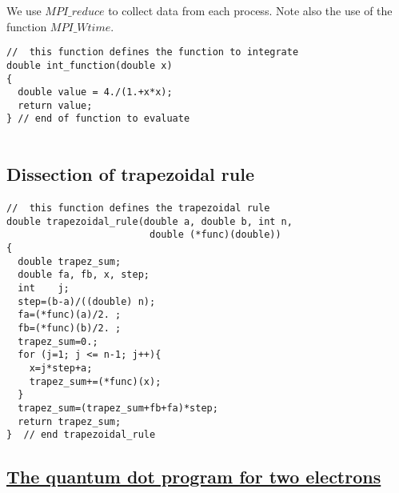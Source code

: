 \documentclass[%
oneside,                 %
final,                   %
10pt]{article}
\begin{document}
We use $MPI\_reduce$ to collect data from each process. Note also the use of the function 
$MPI\_Wtime$. 








\begin{verbatim}
//  this function defines the function to integrate
double int_function(double x)
{
  double value = 4./(1.+x*x);
  return value;
} // end of function to evaluate


\end{verbatim}



\subsection*{Dissection of trapezoidal rule}

\paragraph{}



















\begin{verbatim}
//  this function defines the trapezoidal rule
double trapezoidal_rule(double a, double b, int n, 
                         double (*func)(double))
{
  double trapez_sum;
  double fa, fb, x, step;
  int    j;
  step=(b-a)/((double) n);
  fa=(*func)(a)/2. ;
  fb=(*func)(b)/2. ;
  trapez_sum=0.;
  for (j=1; j <= n-1; j++){
    x=j*step+a;
    trapez_sum+=(*func)(x);
  }
  trapez_sum=(trapez_sum+fb+fa)*step;
  return trapez_sum;
}  // end trapezoidal_rule 

\end{verbatim}



\subsection*{\href{{https://github.com/CompPhysics/ComputationalPhysics2/blob/master/doc/Programs/ParallelizationMPI/MPIvmcqdot.cpp}}{The quantum dot program for two electrons}}
\end{document}

